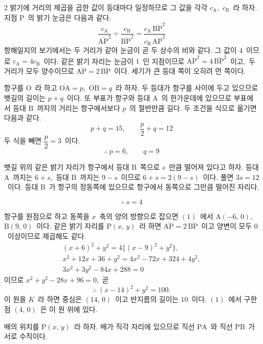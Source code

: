 \documentclass[10pt,fleqn]{article}
\begin{document}
\begin{multicols*}{2}
밝기에 거리의 제곱을 곱한 값이 등대마다 일정하므로 그 값을 각각 $c_{\mathrm{A}}$,\ $c_{\mathrm{B}}$\ 라 하자. 지점 $\mathrm{P}$\ 의 밝기 눈금은 다음과 같다.
$$\dfrac{c_{\mathrm{A}}}{\overline{\mathrm{AP}}^{2}}\div\dfrac{c_{\mathrm{B}}}{\overline{\mathrm{BP}}^{2}}=\dfrac{c_{\mathrm{A}}\,\overline{\mathrm{BP}}^{2}}{c_{\mathrm{B}}\,\overline{\mathrm{AP}}^{2}}$$
항해일지의 보기에서는 두 거리가 같아 눈금이 곧 두 상수의 비와 같다. 그 값이 $4$\ 이므로 $c_{\mathrm{A}}=4c_{\mathrm{B}}$\ 이다. 같은 밝기 자리는 눈금이 $1$\ 인 지점이므로 $\overline{\mathrm{AP}}^{2}=4\,\overline{\mathrm{BP}}^{2}$\ 이고,\ 두 거리가 모두 양수이므로 $\overline{\mathrm{AP}}=2\,\overline{\mathrm{BP}}$\ 이다. 세기가 큰 등대 쪽이 오히려 먼 쪽이다.

 항구를 $\mathrm{O}$\ 라 하고 $\overline{\mathrm{OA}}=p$,\ $\overline{\mathrm{OB}}=q$\ 라 하자. 두 등대가 항구를 사이에 두고 있으므로 뱃길의 길이는 $p+q$\ 이다. 또 부표가 항구와 등대 $\mathrm{A}$\ 의 한가운데에 있으므로 부표에서 등대 $\mathrm{B}$\ 까지의 거리는 항구에서보다 $p$\ 의 절반만큼 길다. 두 조건을 식으로 옮기면 다음과 같다.
$$p+q=15,\qquad \dfrac{p}{2}+q=12$$
두 식을 빼면 $\dfrac{p}{2}=3$\ 이다.
$$\therefore\ p=6,\qquad q=9$$

뱃길 위의 같은 밝기 자리가 항구에서 등대 $\mathrm{B}$\ 쪽으로 $s$\ 만큼 떨어져 있다고 하자. 등대 $\mathrm{A}$\ 까지는 $6+s$,\ 등대 $\mathrm{B}$\ 까지는 $9-s$\ 이므로 $6+s=2(9-s)$\ 이다. 풀면 $3s=12$\ 이다. 등대 $\mathrm{B}$\ 가 항구의 정동쪽에 있으므로 항구에서 동쪽으로 그만큼 떨어진 자리다.

$$\therefore\ s=4$$

 항구를 원점으로 하고 동쪽을 $x$\ 축의 양의 방향으로 잡으면 $(1)$\ 에서 $\mathrm{A}(-6,\,0)$,\ $\mathrm{B}(9,\,0)$\ 이다. 같은 밝기 자리를 $\mathrm{P}(x,\,y)$\ 라 하면 $\overline{\mathrm{AP}}=2\,\overline{\mathrm{BP}}$\ 이고 양변이 모두 $0$\ 이상이므로 제곱해도 같다.
\begin{gather*}
(x+6)^{2}+y^{2}=4\{(x-9)^{2}+y^{2}\},\\[2pt]
x^{2}+12x+36+y^{2}=4x^{2}-72x+324+4y^{2},\\[2pt]
3x^{2}+3y^{2}-84x+288=0
\end{gather*}
이므로 $x^{2}+y^{2}-28x+96=0$,\ 곧
$$\therefore\ (x-14)^{2}+y^{2}=100.$$
이 원을 $K$\ 라 하면 중심은 $(14,\,0)$\ 이고 반지름의 길이는 $10$\ 이다. $(1)$\ 에서 구한 점 $(4,\,0)$\ 은 이 원 위에 있다.

 배의 위치를 $\mathrm{P}(x,\,y)$\ 라 하자. 배가 직각 자리에 있으므로 직선 $\mathrm{PA}$\ 와 직선 $\mathrm{PB}$\ 가 서로 수직이다.


\end{multicols*}
\end{document}
